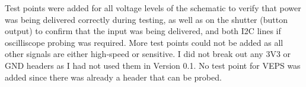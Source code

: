 Test points were added for all voltage levels of the schematic to verify that power was being delivered correctly during testing, as well as on the shutter (button output) to confirm that the input was being delivered, and both I2C lines if oscilliscope probing was required. More test points could not be added as all other signals are either high-speed or sensitive. I did not break out any 3V3 or GND headers as I had not used them in Version 0.1. No test point for VEPS was added since there was already a header that can be probed.